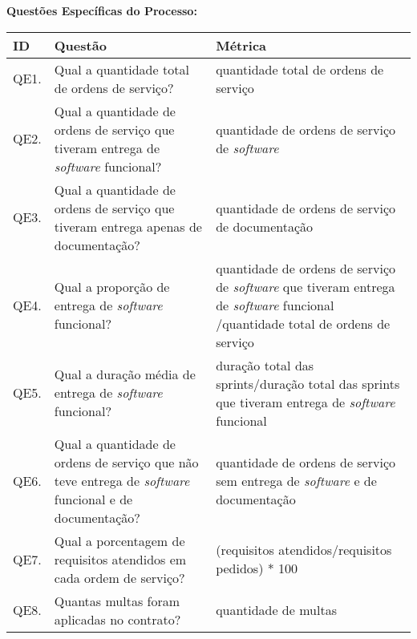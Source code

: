 \textbf{Questões Específicas do Processo:}

\begin{table}[H]
\footnotesize
\center
\begin{tabular}{|p{0.8cm}|p{7.0cm}|p{6.0cm}|}
\hline
\textbf{ID} & \textbf{Questão}                                                                                                                                  & \textbf{Métrica}    \\ \hline
QE1.        & Qual a quantidade total de ordens de serviço?                                                                                                    &  quantidade total de ordens de serviço         \\ \hline
QE2.        & Qual a quantidade de ordens de serviço que tiveram entrega de \textit{software} funcional?                                                                & quantidade de ordens de serviço de \textit{software}          \\ \hline
QE3.        & Qual a quantidade de ordens de serviço que tiveram entrega apenas de documentação?                                                               & quantidade de ordens de serviço de documentação            \\ \hline
QE4.        & Qual a proporção de entrega de \textit{software} funcional?                                                                                               &  quantidade de ordens de serviço de \textit{software} que tiveram entrega de \textit{software} funcional /quantidade total de ordens de serviço                          \\ \hline
QE5.        & Qual a duração média de entrega de \textit{software} funcional?                                                                                           &  duração total das sprints/duração total das sprints que tiveram entrega de \textit{software} funcional                   \\ \hline
QE6.        & Qual a quantidade de ordens de serviço que não teve entrega de \textit{software} funcional e  de documentação?   &  quantidade de ordens de serviço sem entrega de \textit{software} e de documentação        \\ \hline
QE7.        & Qual a porcentagem de requisitos atendidos em cada ordem de serviço?                                                                             &  (requisitos atendidos/requisitos pedidos) * 100 \\ \hline
QE8.        & Quantas multas foram aplicadas no contrato?                                                                                                      &  quantidade de multas                      \\ \hline

\end{tabular}
\end{table}
